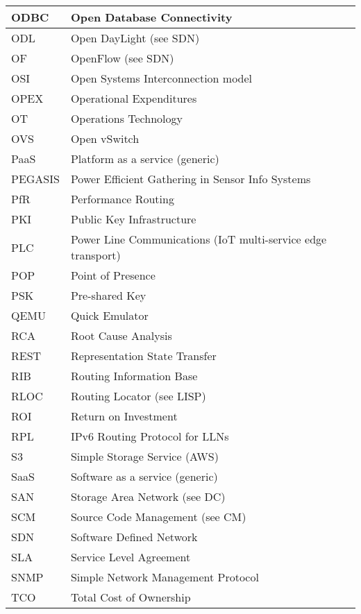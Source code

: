 \begin{longtable}{ll}
  ODBC		&		Open Database Connectivity		\\ \midrule
  ODL		&		Open DayLight (see SDN)		\\ \midrule
  OF		&		OpenFlow (see SDN)		\\ \midrule
  OSI		&		Open Systems Interconnection model		\\ \midrule
  OPEX		&		Operational Expenditures		\\ \midrule
  OT		&		Operations Technology		\\ \midrule
  OVS		&		Open vSwitch		\\ \midrule
  PaaS		&		Platform as a service (generic)		\\ \midrule
  PEGASIS	&		Power Efficient Gathering in Sensor Info Systems		\\ \midrule
  PfR		&		Performance Routing		\\ \midrule
  PKI		&		Public Key Infrastructure		\\ \midrule
  PLC		&		Power Line Communications (IoT multi-service edge transport)		\\ \midrule
  POP		&		Point of Presence		\\ \midrule
  PSK		&		Pre-shared Key		\\ \midrule
  QEMU		&		Quick Emulator		\\ \midrule
  RCA		&		Root Cause Analysis		\\ \midrule
  REST		&		Representation State Transfer		\\ \midrule
  RIB		&		Routing Information Base		\\ \midrule
  RLOC		&		Routing Locator (see LISP)		\\ \midrule
  ROI		&		Return on Investment		\\ \midrule
  RPL		&		IPv6 Routing Protocol for LLNs		\\ \midrule
  S3		&		Simple Storage Service (AWS)		\\ \midrule
  SaaS		&		Software as a service (generic)		\\ \midrule
  SAN		&		Storage Area Network (see DC)		\\ \midrule
  SCM		&		Source Code Management (see CM)		\\ \midrule
  SDN		&		Software Defined Network		\\ \midrule
  SLA		&		Service Level Agreement		\\ \midrule
  SNMP		&		Simple Network Management Protocol		\\ \midrule
  TCO		&		Total Cost of Ownership		\\ \midrule

\end{longtable}
